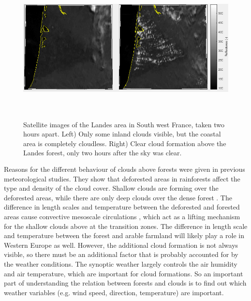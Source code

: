 \documentclass{article}
\begin{document}
\begin{figure}[H]
	\centering
	\includegraphics[height=3in]{cloudform1.png}
	\caption{Satellite images of the Landes area in South west France, taken two hours apart. Left) Only some inland clouds visible, but the coastal area is completely cloudless. Right) Clear cloud formation above the Landes forest, only two hours after the sky was clear. }
	\label{fig:cloudsoverforest}
\end{figure}

Reasons for the different behaviour of clouds above forests were given in previous meteorological studies. They show that deforested areas in rainforests affect the type and density of the cloud cover. Shallow clouds are forming over the deforested areas, while there are only deep clouds over the dense forest \parencite{chagnon04}. The difference in length scales \parencite{irvine97} and temperature between the deforested and forested areas cause convective mesoscale circulations \parencite{souza00}, which act as a lifting mechanism for the shallow clouds above at the transition zones. The difference in length scale and temperature between the forest and arable farmland will likely play a role in Western Europe as well. However, the additional cloud formation is not always visible, so there must be an additional factor that is probably accounted for by the weather conditions. The synoptic weather largely controls the air humidity and air temperature, which are important for cloud formations. So an important part of understanding the relation between forests and clouds is to find out which weather variables (e.g. wind speed, direction, temperature) are important.\\
\end{document}
